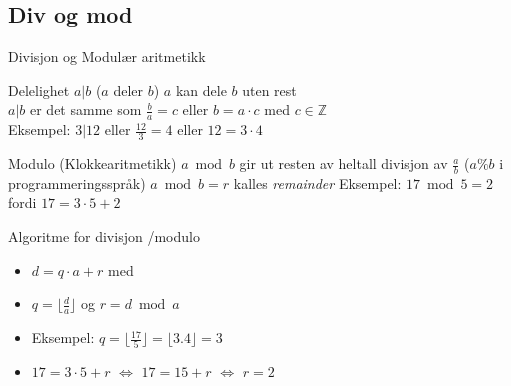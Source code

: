 \subsection*{Div og mod}

\begin{frame}{Divisjon og Modulær aritmetikk}
       \begin{block}{Delelighet $a|b$ ($a$ deler $b$)}
              $a$ kan dele $b$ uten rest\\
              $a|b$ er det samme som $\frac{b}{a}=c$ eller $b=a\cdot c$ med $c \in \mathbb{Z}$\\
              Eksempel: $3|12$ eller $\frac{12}{3} = 4$ eller $12=3\cdot 4$
       \end{block}
       \pause
       \begin{block}{Modulo (Klokkearitmetikk)}
              $a \bmod b$ gir ut resten av heltall divisjon av $\frac{a}{b}$ ($a\%b$ i programmeringsspråk)
              $a \bmod b = r$ kalles \textit{remainder}
              Eksempel: $17 \bmod 5 = 2$ fordi $17 = 3 \cdot 5 + 2$ 
       \end{block}
\end{frame}

\begin{frame}[fragile]{Algoritme for divisjon /modulo}
       \begin{itemize}[<+->]
              \item $d=q\cdot a + r$ med
              \item $q=\big\lfloor{\frac{d}{a}}\big\rfloor$ og $r=d \bmod a$
              \item Eksempel: $q=\big\lfloor{\frac{17}{5}}\big\rfloor = \lfloor{3.4}\rfloor=3$
              \item $17=3\cdot 5 + r$ $\iff$ $17=15+r$ $\iff$ $r=2$
       \end{itemize}
\end{frame}

